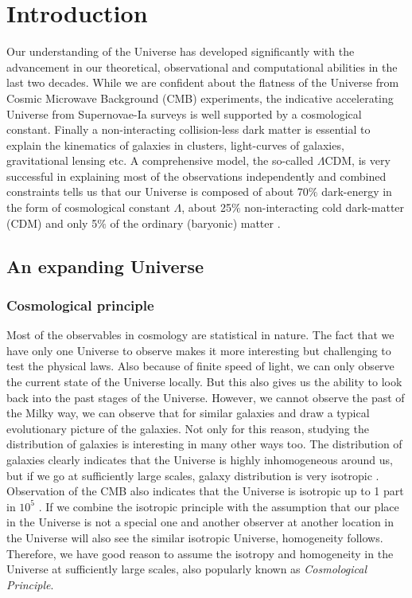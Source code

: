 \chapter{Introduction}\label{Introduction}

Our understanding of the Universe has developed significantly with the advancement in our 
theoretical, observational and computational abilities in the last two decades. 
While we are confident about the flatness of the Universe from Cosmic Microwave 
Background (CMB) experiments, 
the indicative accelerating Universe from Supernovae-Ia surveys is well supported
by a cosmological constant. Finally a non-interacting collision-less dark matter is essential 
to explain the kinematics of galaxies in clusters, light-curves of galaxies, 
gravitational lensing etc. A comprehensive model, the so-called $\Lambda$CDM,
is very successful in explaining most of the observations independently and 
combined constraints tells us that our Universe is composed of about 70$\%$
dark-energy in the form of cosmological constant $\Lambda$, about 25$\%$ non-interacting
cold dark-matter (CDM) and only 5$\%$ of the ordinary (baryonic) matter 
\citep{2015arXiv150201589P}. 


\section{An expanding Universe}

\subsection{Cosmological principle}

Most of the observables in cosmology are statistical in nature. 
The fact that we have only one Universe to observe
makes it more interesting but challenging to test the physical laws. Also because
of finite speed of light, we can only observe the current state of the Universe locally. 
But this also gives us the ability to look back into the past stages of the Universe. 
However, we cannot observe the past of the Milky way, we can observe that for similar
galaxies and draw a typical evolutionary picture of the galaxies. Not only for this
reason, studying the distribution of galaxies is interesting in many other ways too. 
The distribution of galaxies clearly indicates that the Universe is highly 
inhomogeneous around us, but if we go at sufficiently large scales, 
galaxy distribution is very isotropic \citep{2012ApJS..203...21A,2015arXiv150100963A}.
Observation of the CMB also indicates 
that the Universe is isotropic up to 1 part in $10^{5}$ \citep{2011A&A...536A..19P}. 
If we combine the isotropic principle with the 
assumption that our place in the Universe is not a special one and another observer
at another location in the Universe will also see the similar isotropic Universe,
homogeneity follows. Therefore, we have good reason to assume the isotropy 
and homogeneity in the Universe at sufficiently large scales, also popularly
known as {\it Cosmological Principle}.

